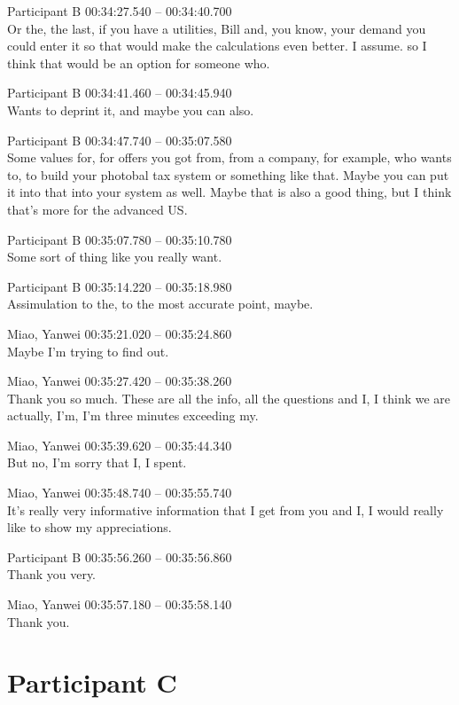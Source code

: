 {Participant B 00:34:27.540 -- 00:34:40.700 \\
Or the, the last, if you have a utilities, Bill and, you know, your demand you could enter it so that would make the calculations even better. I assume. so I think that would be an option for someone who.

Participant B 00:34:41.460 -- 00:34:45.940 \\
Wants to deprint it, and maybe you can also.

Participant B 00:34:47.740 -- 00:35:07.580 \\
Some values for, for offers you got from, from a company, for example, who wants to, to build your photobal tax system or something like that. Maybe you can put it into that into your system as well. Maybe that is also a good thing, but I think that's more for the advanced US.

Participant B 00:35:07.780 -- 00:35:10.780 \\
Some sort of thing like you really want.

Participant B 00:35:14.220 -- 00:35:18.980 \\
Assimulation to the, to the most accurate point, maybe.

Miao, Yanwei 00:35:21.020 -- 00:35:24.860 \\
Maybe I'm trying to find out.

Miao, Yanwei 00:35:27.420 -- 00:35:38.260 \\
Thank you so much. These are all the info, all the questions and I, I think we are actually, I'm, I'm three minutes exceeding my.

Miao, Yanwei 00:35:39.620 -- 00:35:44.340 \\
But no, I'm sorry that I, I spent.

Miao, Yanwei 00:35:48.740 -- 00:35:55.740 \\
It's really very informative information that I get from you and I, I would really like to show my appreciations.

Participant B 00:35:56.260 -- 00:35:56.860 \\
Thank you very.

Miao, Yanwei 00:35:57.180 -- 00:35:58.140 \\
Thank you.
}


\section*{Participant C}

